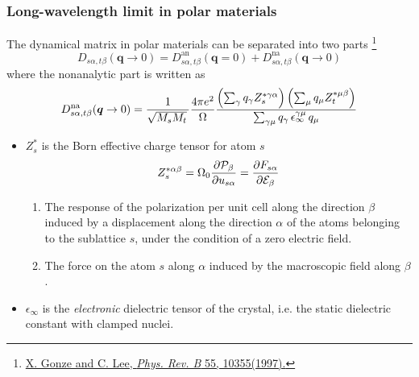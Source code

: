 \begin{frame}
  \frametitle{Long-wavelength limit in polar materials}
  The dynamical matrix in polar materials can be separated into two parts
  \footnote{
    \href{https://journals.aps.org/prb/abstract/10.1103/PhysRevB.55.10355}
         {X. Gonze and C. Lee, \textit{Phys. Rev. B}\/ 55, 10355(1997).}
  }
  \begin{equation*}
    D_{s\alpha,t\beta}(\boldsymbol{q} \to 0) = 
    D^{\text{an}}_{s\alpha,t\beta}(\boldsymbol{q} = 0) +
    D^{\text{na}}_{s\alpha,t\beta}(\boldsymbol{q} \to 0)
  \end{equation*}
  where the nonanalytic part is written as
  \begin{equation}
    \label{eq:dynmat_nac}
    D^{\text{na}}_{s\alpha,t\beta}(\boldsymbol{q} \to 0)
    =
    {1\over\sqrt{M_sM_t}\,}
    {4\pi e^2\over\Omega}
    \frac{
      \left(
        \sum_{\gamma} q_\gamma Z^{*\gamma\alpha}_s
      \right) 
      \left(
      \sum_{\mu} q_\mu Z^{*\mu\beta}_t
      \right) 
    }{
      \sum_{\gamma\mu} q_\gamma \, \epsilon_\infty^{\gamma\mu} \,q_\mu 
    }
  \end{equation}
  \begin{itemize}
    \item
      $Z^*_s$ is the Born effective charge tensor for atom $s$
        \begin{equation*}
        Z_s^{*\alpha\beta} = \Omega_0
        \frac{
            \partial {\cal P}_\beta
        }{
            \partial u_{s\alpha}
        }
        =
        \frac{
            \partial F_{s\alpha}
        }{
            \partial {\cal E}_\beta
        }
        \end{equation*}

        \begin{enumerate}
        \setlength\itemsep{\smallskipamount}
        \item The response of the polarization per unit cell along the direction
          $\beta$ induced by a displacement along the direction $\alpha$ of the atoms
          belonging to the sublattice $s$, under the condition of a zero electric
          field.
          
        \item The force on the atom $s$ along $\alpha$ induced by the macroscopic
          field along $\beta$.
        \end{enumerate}
        
    \item $\epsilon_\infty$ is the \emph{electronic} dielectric tensor of the
      crystal, i.e. the static dielectric constant with clamped nuclei.
  \end{itemize}
\end{frame}


